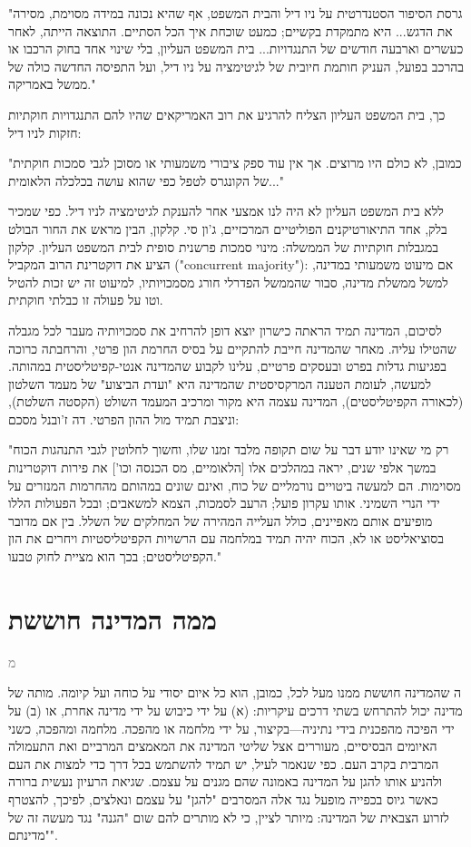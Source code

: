 \documentclass[10pt,oneside]{book}
\newcommand{\hebrewchapter}[2]{%
  \chapter*{#1}%
  \addcontentsline{toc}{chapter}{#1}%
  \lettrine[lines=4, lhang=0.1, loversize=0.5, findent=0pt]{\textcolor{gray} #2}{}%
}
\begin{document}
\begin{quoting}
"גרסת הסיפור הסטנדרטית על ניו דיל והבית המשפט, אף שהיא נכונה במידה מסוימת, מסירה את הדגש... היא מתמקדת בקשיים; כמעט שוכחת איך הכל הסתיים. התוצאה הייתה, לאחר כעשרים וארבעה חודשים של התנגדויות... בית המשפט העליון, בלי שינוי אחד בחוק הרכבו או בהרכב בפועל, העניק חותמת חיובית של לגיטימציה על ניו דיל, ועל התפיסה החדשה כולה של ממשל באמריקה."
\end{quoting}

כך, בית המשפט העליון הצליח להרגיע את רוב האמריקאים שהיו להם התנגדויות חוקתיות חזקות לניו דיל:

\begin{quoting}
"כמובן, לא כולם היו מרוצים. אך אין עוד ספק ציבורי משמעותי או מסוכן לגבי סמכות חוקתית של הקונגרס לטפל כפי שהוא עושה בכלכלה הלאומית..."
\end{quoting}

ללא בית המשפט העליון לא היה לנו אמצעי אחר להענקת לגיטימציה לניו דיל. כפי שמכיר בלק, אחד התיאורטיקנים הפוליטיים המרכזיים, ג'ון סי. קלקון, הבין מראש את החור הבולט במגבלות חוקתיות של הממשלה: מינוי סמכות פרשנית סופית לבית המשפט העליון. קלקון הציע את דוקטרינת הרוב המקביל ("concurrent majority"): אם מיעוט משמעותי במדינה, למשל ממשלת מדינה, סבור שהממשל הפדרלי חורג מסמכויותיו, למיעוט זה יש זכות להטיל וטו על פעולה זו כבלתי חוקתית.

לסיכום, המדינה תמיד הראתה כישרון יוצא דופן להרחיב את סמכויותיה מעבר לכל מגבלה שהטילו עליה. מאחר שהמדינה חייבת להתקיים על בסיס החרמת הון פרטי, והרחבתה כרוכה בפגיעות גדלות בפרט ובעסקים פרטיים, עלינו לקבוע שהמדינה אנטי-קפיטליסטית במהותה. למעשה, לעומת הטענה המרקסיסטית שהמדינה היא "ועדת הביצוע" של מעמד השלטון (לכאורה הקפיטליסטים), המדינה עצמה היא מקור ומרכיב המעמד השולט (הקסטה השלטת), וניצבת תמיד מול ההון הפרטי. דה ז'ובנל מסכם:

\begin{quoting}
"רק מי שאינו יודע דבר על שום תקופה מלבד זמנו שלו, וחשוך לחלוטין לגבי התנהגות הכוח במשך אלפי שנים, יראה במהלכים אלו [הלאומיים, מס הכנסה וכו'] את פירות דוקטרינות מסוימות. הם למעשה ביטויים נורמליים של כוח, ואינם שונים במהותם מהחרמות המנזרים על ידי הנרי השמיני. אותו עקרון פועל; הרעב לסמכות, הצמא למשאבים; ובכל הפעולות הללו מופיעים אותם מאפיינים, כולל העלייה המהירה של המחלקים של השלל. בין אם מדובר בסוציאליסט או לא, הכוח יהיה תמיד במלחמה עם הרשויות הקפיטליסטיות ויחרים את הון הקפיטליסטים; בכך הוא מציית לחוק טבעו."
\end{quoting}

\hebrewchapter{ממה המדינה חוששת}{מ}
ה שהמדינה חוששת ממנו מעל לכל, כמובן, הוא כל איום יסודי על כוחה ועל קיומה. מותה של מדינה יכול להתרחש בשתי דרכים עיקריות: (א) על ידי כיבוש על ידי מדינה אחרת, או (ב) על ידי הפיכה מהפכנית בידי נתיניה—בקיצור, על ידי מלחמה או מהפכה. מלחמה ומהפכה, כשני האיומים הבסיסיים, מעוררים אצל שליטי המדינה את המאמצים המרביים ואת התעמולה המרבית בקרב העם. כפי שנאמר לעיל, יש תמיד להשתמש בכל דרך כדי למצות את העם ולהניע אותו להגן על המדינה באמונה שהם מגנים על עצמם. שגיאת הרעיון נעשית ברורה כאשר גיוס בכפייה מופעל נגד אלה המסרבים "להגן" על עצמם ונאלצים, לפיכך, להצטרף לזרוע הצבאית של המדינה: מיותר לציין, כי לא מותרים להם שום "הגנה" נגד מעשה זה של "מדינתם".
\end{document}
